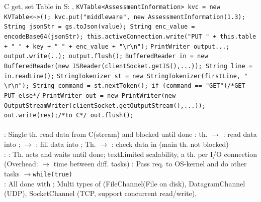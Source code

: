  C get, set Table in S: 
, 
\textbar
{}
\lstinline{KVTable<AssessmentInformation> kvc = new KVTable<~>(); kvc.put("middleware", new AssessmentInformation(1.3);}
\lstinline{String jsonStr = gs.toJson(value); String enc_value = encodeBase64(jsonStr); this.activeConnection.write("PUT " + this.table + " " + key + " " + enc_value + "\r\n");}
\lstinline{PrintWriter output...; output.write(..); output.flush();}
\lstinline{BufferedReader in = new BufferedReader(new ISReader(clientSocket.getIS(),...)); String line = in.readLine();}
\lstinline{StringTokenizer st = new StringTokenizer(firstLine, " \r\n"); String command = st.nextToken(); if (command == "GET")/*GET PUT else*/}
\lstinline{PrintWriter out = new PrintWriter(new OutputStreamWriter(clientSocket.getOutputStream(),...)); out.write(res);/*to C*/ out.flush();}
\\
\\
: 
Single th. read data from C(stream) and blocked until done
: 
th. $\rightarrow$ : 
read data into ; 
 $\rightarrow$ : 
fill data into ; 
Th. $\rightarrow$ : 
check data in  (main th. not blocked)
\\
: 
: Th. acts and waits until  done; 
\orangetext{}text{Limited scalability}, a th. per I/O connection
(Overhead: $\rightarrow$ time between diff. tasks)
: Pass req. to OS-kernel and do other tasks 
$\rightarrow$\lstinline{while(true)} 
\rtext{++:}
\rtext{--:}
\\
: 
All  done with ;
Multi types of 
(FileChannel(File on disk), 
DatagramChannel (UDP), 
SocketChannel (TCP, support concurrent read/write), 
